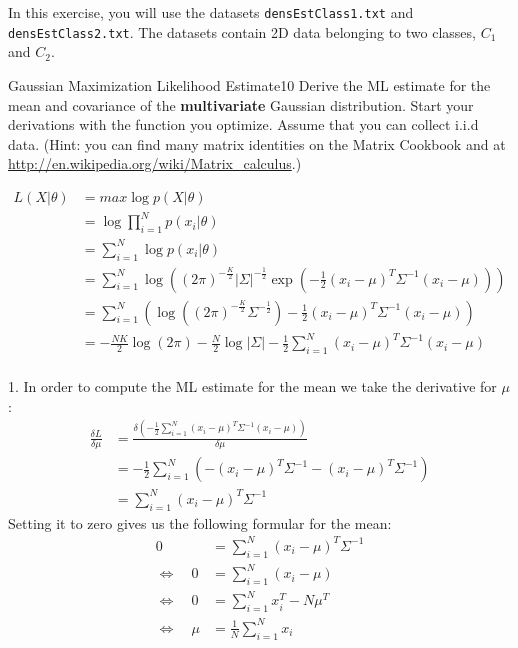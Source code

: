 \newif\ifvimbug
\vimbugfalse

\ifvimbug

\fi

In this exercise, you will use the datasets \texttt{densEstClass1.txt} 
and \texttt{densEstClass2.txt}. The datasets contain 2D data belonging
to two classes, $C_1$ and $C_2$.

\begin{questions}


\begin{question}{Gaussian Maximization Likelihood Estimate}{10}
Derive the ML estimate for the mean and covariance of the \textbf{multivariate} Gaussian distribution. Start your derivations with the function you optimize. Assume that you can collect i.i.d data. (Hint: you can find many matrix identities on the Matrix Cookbook and at \url{http://en.wikipedia.org/wiki/Matrix_calculus}.)

\begin{answer}

\begin{align*}
L(X | \theta ) &= max \log p(X|\theta ) \\
&= \log \prod_{i=1}^{N} p(x_i|\theta ) \\
&= \sum_{i=1}^{N} \log p(x_i|\theta ) \\
&= \sum_{i=1}^{N} \log ( (2\pi )^{-\frac{K}{2}} |\Sigma |^{-\frac{1}{2}} \exp (-\frac{1}{2} (x_i-\mu )^{T} \Sigma^{-1}(x_i-\mu ))) \\
&= \sum_{i=1}^{N} ( \log ((2\pi )^{-\frac{K}{2}}\Sigma^{-\frac{1}{2}})-\frac{1}{2} (x_i-\mu )^T \Sigma^{-1}(x_i-\mu) ) \\
&= -\frac{N K}{2} \log (2\pi )-\frac{N}{2} \log |\Sigma |-\frac{1}{2}\sum_{i=1}^{N}(x_i-\mu )^T \Sigma^{-1}(x_i-\mu )\\
\end{align*}

1. In order to compute the ML estimate for the mean we take the derivative for $\mu $:
\begin{align*}
\frac{\delta L}{\delta \mu} &= \frac{\delta(-\frac{1}{2}\sum_{i=1}^{N}(x_i-\mu )^T \Sigma^{-1} (x_i-\mu ))}{\delta \mu} \\
&= -\frac{1}{2} \sum_{i=1}^{N}(-(x_i-\mu )^T \Sigma^{-1}-(x_i-\mu )^T \Sigma^{-1}) \\
&= \sum_{i=1}^{N}(x_i-\mu )^T\Sigma^{-1}
\end{align*}
Setting it to zero gives us the following formular for the mean:
\begin{align*}
0 &= \sum_{i=1}^{N}(x_i-\mu )^T\Sigma^{-1} \\
\Leftrightarrow \quad 0 &= \sum_{i=1}^{N}(x_i-\mu ) \\
\Leftrightarrow \quad 0 &= \sum_{i=1}^{N}x_i^T-N\mu^T \\
\Leftrightarrow \quad \mu &= \frac{1}{N}\sum_{i=1}^{N}x_i 
\end{align*}


\end{answer}
\end{question}
\end{questions}
